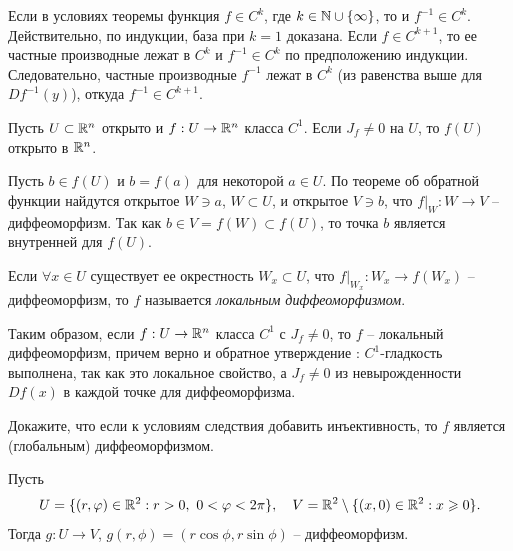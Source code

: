 
\begin{note}
	Если в условиях теоремы функция $f \in C^k$, где $k \in \mathbb{N} \cup \{\infty\}$, то и $f^{-1} \in C^k$.
	Действительно, по индукции, база при $k = 1$ доказана. Если $f \in C^{k+1}$, то ее частные производные лежат в $C^k$ и $f^{-1} \in C^k$ по предположению индукции. 
	Следовательно, частные производные $f^{-1}$ лежат в $C^k$ (из равенства выше для $Df^{-1}(y)$), откуда $f^{-1} \in C^{k+1}$.
\end{note}

\begin{corollary}
	Пусть $U \subset \mathbb{R}^n$ открыто и $f : U \to \mathbb{R}^n$ класса $C^1$. Если $J_f \neq 0$ на $U$, то $f(U)$ открыто в $\mathbb{R}^n$.
\end{corollary}

\begin{myproof}
	Пусть $b \in f(U)$ и $b = f(a)$ для некоторой $a \in U$. 
	По теореме об обратной функции найдутся открытое $W \ni a$, $W \subset U$, и открытое $V \ni b$, что $f|_W : W \to V$ -- диффеоморфизм. 
	Так как $b \in V = f(W) \subset f(U)$, то точка $b$ является внутренней для $f(U)$.
\end{myproof}

\begin{definition}
	Если $\forall x \in U$ существует ее окрестность $W_x \subset U$, что $f|_{W_x} : W_x \to f(W_x)$ -- диффеоморфизм, то $f$ называется \textit{локальным диффеоморфизмом}.
\end{definition}

Таким образом, если $f : U \to \mathbb{R}^n$ класса $C^1$ с $J_f \neq 0$, то $f$ -- локальный диффеоморфизм, причем верно и обратное утверждение : $C^1$-гладкость выполнена, так как это локальное свойство, а $J_f \neq 0$ из невырожденности $Df(x)$ в каждой точке для диффеоморфизма. 

\begin{problem}
	Докажите, что если к условиям следствия добавить инъективность, то $f$ является (глобальным) диффеоморфизмом.
\end{problem}

\begin{example}
	Пусть 
	\[ U = \{(r, \varphi) \in \mathbb{R}^2 : r > 0, \ 0 < \varphi < 2 \pi \}, \quad V = \mathbb{R}^2 \setminus \{(x, 0) \in \mathbb{R}^2 : x \geqslant 0\}. \]
	Тогда $g : U \to V$, $g(r, \phi) = (r \cos \phi, r \sin \phi)$ -- диффеоморфизм. 
\end{example}

